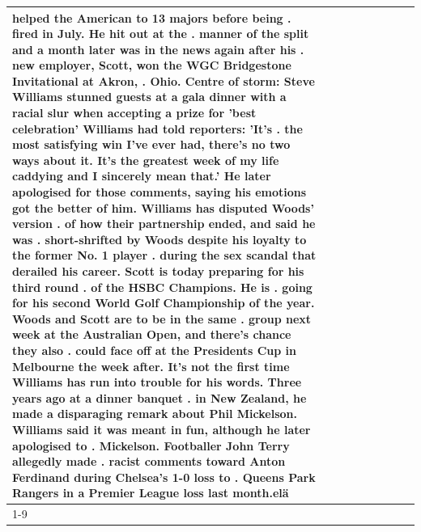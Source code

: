 \begin{table}[H]
\begin{tabular}{lllrlllll}
helped the American to 13 majors before being . fired in July. He hit out at the . manner of the split and a month later was in the news again after his . new employer, Scott, won the WGC Bridgestone Invitational at Akron, . Ohio. Centre of storm: Steve Williams stunned guests at a gala dinner with a racial slur when accepting a prize for 'best celebration' Williams had told reporters: 'It's . the most satisfying win I've ever had, there's no two ways about it. It's the greatest week of my life caddying and I sincerely mean that.' He later apologised for those comments, saying his emotions got the better of him. Williams has disputed Woods' version . of how their partnership ended, and said he was . short-shrifted by Woods despite his loyalty to the former No. 1 player . during the sex scandal that derailed his career. Scott is today preparing for his third round . of the HSBC Champions. He is . going for his second World Golf Championship of the year. Woods and Scott are to be in the same . group next week at the Australian Open, and there's chance they also . could face off at the Presidents Cup in Melbourne the week after. It's not the first time Williams has run into trouble for his words. Three years ago at a dinner banquet . in New Zealand, he made a disparaging remark about Phil Mickelson. Williams said it was meant in fun, although he later apologised to . Mickelson. Footballer John Terry allegedly made . racist comments toward Anton Ferdinand during Chelsea's 1-0 loss to . Queens Park Rangers in a Premier League loss last month.elä \\
\cline{1-9}

\end{tabular}
\end{table}
